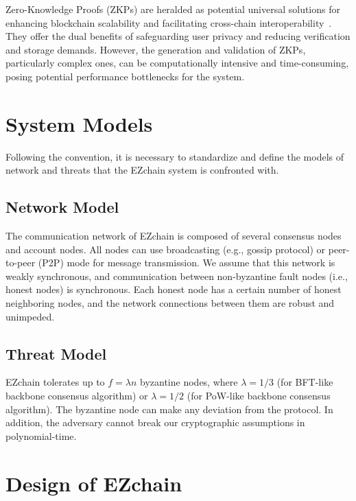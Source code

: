 \documentclass[conference]{IEEEtran}
\begin{document}
Zero-Knowledge Proofs (ZKPs) are heralded as potential universal solutions for enhancing blockchain scalability and facilitating cross-chain interoperability~\cite{bunz2018bulletproofs,garoffolo2020zendoo,sasson2014zerocash,ben2014succinct,bowe2019recursive,gluchowski2019zk,saleh2021blockchain,grassi2021poseidon,yang2020zero}. They offer the dual benefits of safeguarding user privacy and reducing verification and storage demands. However, the generation and validation of ZKPs, particularly complex ones, can be computationally intensive and time-consuming, posing potential performance bottlenecks for the system.

\section{System Models}
\label{sec: system models}
Following the convention, it is necessary to standardize and define the models of network and threats that the EZchain system is confronted with.

\subsection{Network Model}
\label{subsec: Network Model}
The communication network of EZchain is composed of several consensus nodes and account nodes. All nodes can use broadcasting (e.g., gossip protocol) or peer-to-peer (P2P) mode for message transmission. We assume that this network is weakly synchronous, and communication between non-byzantine fault nodes (i.e., honest nodes) is synchronous. Each honest node has a certain number of honest neighboring nodes, and the network connections between them are robust and unimpeded.

\subsection{Threat Model}
\label{subsec: Threat Model}
EZchain tolerates up to $f = \lambda n$ byzantine nodes, where $\lambda = 1/3$ (for BFT-like backbone consensus algorithm) or $\lambda = 1/2$ (for PoW-like backbone consensus algorithm). The byzantine node can make any deviation from the protocol. In addition, the adversary cannot break our cryptographic assumptions in polynomial-time.

\section{Design of EZchain}
\label{sec:Design of EZchain}
\end{document}
